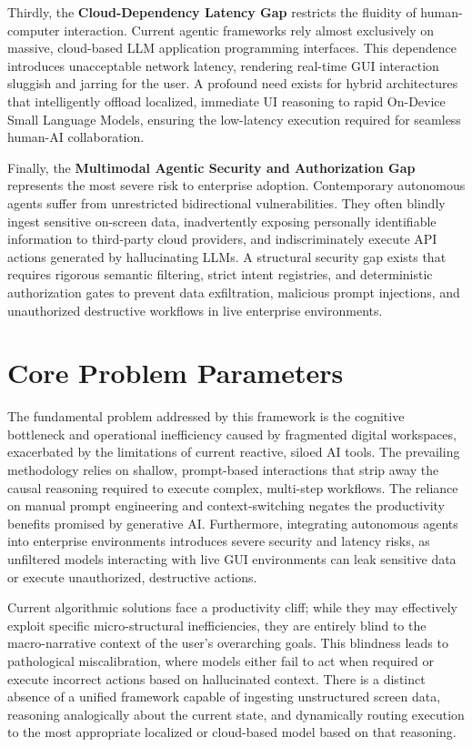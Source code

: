 \documentclass[12pt, a4paper]{report}
\begin{document}
Thirdly, the \textbf{Cloud-Dependency Latency Gap} restricts the fluidity of human-computer interaction. Current agentic frameworks rely almost exclusively on massive, cloud-based LLM application programming interfaces.\cite{hojo2025} This dependence introduces unacceptable network latency, rendering real-time GUI interaction sluggish and jarring for the user. A profound need exists for hybrid architectures that intelligently offload localized, immediate UI reasoning to rapid On-Device Small Language Models, ensuring the low-latency execution required for seamless human-AI collaboration.\cite{hojo2025}

Finally, the \textbf{Multimodal Agentic Security and Authorization Gap} represents the most severe risk to enterprise adoption. Contemporary autonomous agents suffer from unrestricted bidirectional vulnerabilities.\cite{hojo2025} They often blindly ingest sensitive on-screen data, inadvertently exposing personally identifiable information to third-party cloud providers, and indiscriminately execute API actions generated by hallucinating LLMs.\cite{hojo2025} A structural security gap exists that requires rigorous semantic filtering, strict intent registries, and deterministic authorization gates to prevent data exfiltration, malicious prompt injections, and unauthorized destructive workflows in live enterprise environments.\cite{hojo2025}


\chapter{Core Problem Parameters}

The fundamental problem addressed by this framework is the cognitive bottleneck and operational inefficiency caused by fragmented digital workspaces, exacerbated by the limitations of current reactive, siloed AI tools. The prevailing methodology relies on shallow, prompt-based interactions that strip away the causal reasoning required to execute complex, multi-step workflows. The reliance on manual prompt engineering and context-switching negates the productivity benefits promised by generative AI. Furthermore, integrating autonomous agents into enterprise environments introduces severe security and latency risks, as unfiltered models interacting with live GUI environments can leak sensitive data or execute unauthorized, destructive actions.

Current algorithmic solutions face a productivity cliff; while they may effectively exploit specific micro-structural inefficiencies, they are entirely blind to the macro-narrative context of the user's overarching goals. This blindness leads to pathological miscalibration, where models either fail to act when required or execute incorrect actions based on hallucinated context. There is a distinct absence of a unified framework capable of ingesting unstructured screen data, reasoning analogically about the current state, and dynamically routing execution to the most appropriate localized or cloud-based model based on that reasoning.
\end{document}
